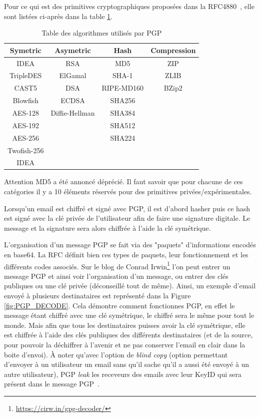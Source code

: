 Pour ce qui est des primitives cryptographiques proposées dans la RFC4880~\cite{RFC4880}, elle sont listées ci-après dans la table \ref{table:refPGPAlgos}.

\begin{table}[h!]
	\centering
	\begin{tabular}{||c c c c||}
		\hline
		Symetric & Asymetric & Hash & Compression \\ [0.5ex]
		\hline\hline
		IDEA & RSA & MD5 & ZIP \\
		TripleDES & ElGamal & SHA-1 & ZLIB \\
		CAST5 & DSA & RIPE-MD160 & BZip2 \\
		Blowfish & ECDSA & SHA256 & \\
		AES-128 & Diffie-Hellman & SHA384 & \\
		AES-192 & & SHA512 & \\
		AES-256 & & SHA224 & \\
		Twofish-256 & & & \\
		IDEA & & & \\
		\hline
	\end{tabular}
\caption{Table des algorithmes utilisés par PGP}
\label{table:refPGPAlgos}
\end{table}

Attention MD5 a été annoncé déprécié. Il faut savoir que pour chacune de ces catégories il y a 10 éléments réservés pour des primitives privées/expérimentales.

Lorsqu'un email est chiffré et signé avec PGP, il est d'abord hasher puis ce hash est signé avec la clé privée de l'utilisateur afin de faire une signature digitale. Le message et la signature sera alors chiffrée à l'aide la clé symétrique.

L'organisation d'un message PGP se fait via des "paquets" d'informations encodés en base64. La RFC définit bien ces types de paquets, leur fonctionnement et les différents codes associés. Sur le blog de Conrad Irwin\footnote{\url{https://cirw.in/gpg-decoder/}} l'on peut entrer un message PGP et ainsi voir l'organisation d'un message, ou entrer des clés publiques ou une clé privée (déconseillé tout de même). Ainsi, un exemple d'email envoyé à plusieurs destinataires est représenté dans la Figure \ref{fig:PGP_DECODE}. Cela démontre comment fonctionnes PGP, en effet le message étant chiffré avec une clé symétrique, le chiffré sera le même pour tout le monde. Mais afin que tous les destinataires puisses avoir la clé symétrique, elle est chiffrée à l'aide des clés publiques des différents destinataires (et de la source, pour pouvoir la déchiffrer à l'avenir et ne pas conserver l'email en clair dans la boite d'envoi). À noter qu'avec l'option de \textit{blind copy} (option permettant d'envoyer à un utilisateur un email sans qu'il sache qu'il a aussi été envoyé à un autre utilisateur), PGP \textit{leak} les receveurs des emails avec leur KeyID qui sera présent dans le message PGP~\cite{BccPrivacy}.

